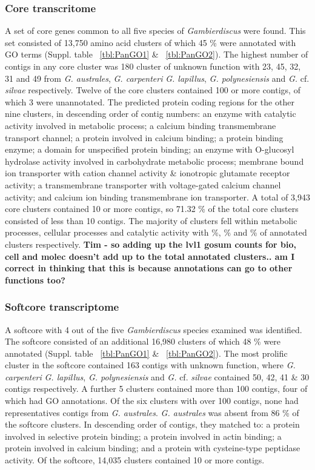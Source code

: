 \documentclass[12pt]{article}
\begin{document}
\subsubsection*{Core transcritome}
A set of core genes common to all five species of \textit{Gambierdiscus} were found. 
This set consisted of 13,750 amino acid clusters of which 45 \% were annotated with GO terms (Suppl. table ~\ref{tbl:PanGO1} \& ~\ref{tbl:PanGO2}). 
The highest number of contigs in any core cluster was 180 cluster of unknown function with 23, 45, 32, 31 and 49 from \textit{G. australes}, \textit{G. carpenteri} \textit{G. lapillus}, \textit{G. polynesiensis} and \textit{G.} cf. \textit{silvae} respectively. 
Twelve of the core clusters contained 100 or more contigs, of which 3 were unannotated. 
The predicted protein coding regions for the other nine clusters, in descending order of contig numbers: an enzyme with catalytic activity involved in metabolic process; a calcium binding transmembrane transport channel; a protein involved in calcium binding; a protein binding enzyme; a domain for unspecified protein binding; an enzyme with O-glucosyl hydrolase activity involved in carbohydrate metabolic process; membrane bound ion transporter with cation channel activity \& ionotropic glutamate receptor activity; a transmembrane transporter with voltage-gated calcium channel activity; and calcium ion binding transmembrane ion transporter. 
A total of 3,943 core clusters contained 10 or more contigs, so 71.32 \% of the total core clusters consisted of less than 10 contigs. 
The majority of  clusters fell within metabolic processes, cellular processes and catalytic activity with \%, \% and \% of annotated clusters respectively. \textbf{Tim - so adding up the lvl1 gosum counts for bio, cell and molec doesn't add up to the total annotated clusters.. am I correct in thinking that this is because annotations can go to other functions too?}

\subsubsection*{Softcore transcriptome}
A softcore with 4 out of the five \textit{Gambierdiscus} species examined was identified. 
The softcore consisted of an additional 16,980 clusters of which 48 \% were annotated  (Suppl. table ~\ref{tbl:PanGO1} \& ~\ref{tbl:PanGO2}). 
The most prolific cluster in the softcore contained 163 contigs with unknown function, where \textit{G. carpenteri} \textit{G. lapillus}, \textit{G. polynesiensis} and \textit{G.} cf. \textit{silvae} contained 50, 42, 41 \& 30 contigs respectively. 
A further 5 clusters contained more than 100 contigs, four of which had GO annotations. 
Of the six clusters with over 100 contigs, none had representatives contigs from \textit{G. australes}. 
\textit{G. australes} was absent from 86 \% of the softcore clusters. 
In descending order of contigs, they matched to: a protein involved in selective protein binding; a protein involved in actin binding; a protein involved in calcium binding; and a protein with cysteine-type peptidase activity. 
Of the softcore, 14,035 clusters contained 10 or more contigs. 
\end{document}
